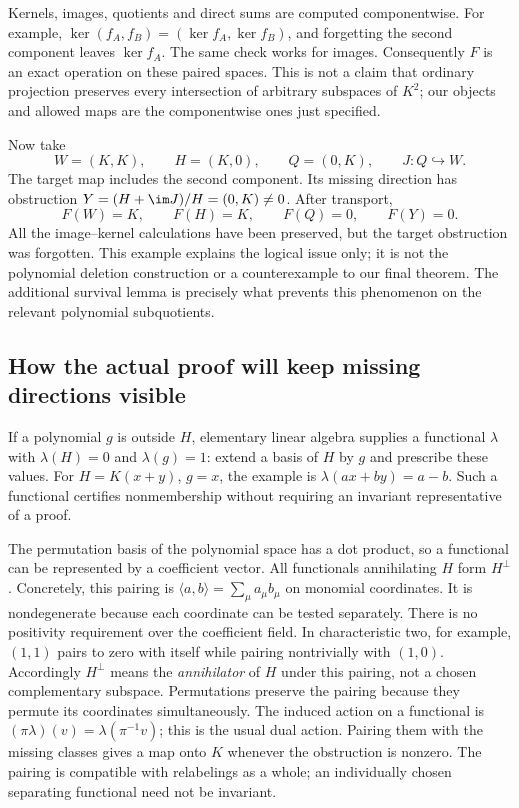 \documentclass[11pt,a4paper,oneside,openany]{book}
\theoremstyle{definition}\newtheorem{definition}[theorem]{Definition}
\theoremstyle{remark}\newtheorem{remark}[theorem]{Remark}
\numberwithin{equation}{chapter}
\begin{document}
Kernels, images, quotients and direct sums are computed componentwise.
For example, $\ker(f_A,f_B)=(\ker f_A,\ker f_B)$, and forgetting the
second component leaves $\ker f_A$. The same check works for images.
Consequently $F$ is an exact operation on these paired spaces.
This is not a claim that ordinary projection preserves every
intersection of arbitrary subspaces of $K^2$; our objects and allowed
maps are the componentwise ones just specified.

Now take
\[
 W=(K,K),\qquad H=(K,0),\qquad Q=(0,K),\qquad
                         J:Q\hookrightarrow W.
\]
The target map includes the second component. Its missing direction
has obstruction
$Y=(H+\im J)/H=(0,K)\ne0$.
After transport,
\[
             F(W)=K,\qquad F(H)=K,\qquad F(Q)=0,\qquad F(Y)=0.
\]
All the image--kernel calculations have been preserved, but the
target obstruction was forgotten.
This example explains the logical issue only; it is not the
polynomial deletion construction or a counterexample to our final
theorem. The additional survival lemma is precisely what prevents
this phenomenon on the relevant polynomial subquotients.

\subsection{How the actual proof will keep missing directions visible}
If a polynomial $g$ is outside $H$, elementary linear algebra supplies
a functional $\lambda$ with $\lambda(H)=0$ and $\lambda(g)=1$:
extend a basis of $H$ by $g$ and prescribe these values.
For $H=K(x+y)$, $g=x$, the example is
$\lambda(ax+by)=a-b$.
Such a functional certifies nonmembership without requiring an
invariant representative of a proof.

The permutation basis of the polynomial space has a dot product,
so a functional can be represented by a coefficient vector.
All functionals annihilating $H$ form $H^\perp$.
Concretely, this pairing is
$\langle a,b\rangle=\sum_\mu a_\mu b_\mu$ on monomial coordinates.
It is nondegenerate because each coordinate can be tested separately.
There is no positivity requirement over the coefficient field.
In characteristic two, for example, $(1,1)$ pairs to zero with itself
while pairing nontrivially with $(1,0)$.
Accordingly $H^\perp$ means the \emph{annihilator} of $H$ under this
pairing, not a chosen complementary subspace.
Permutations preserve the pairing because they permute its coordinates
simultaneously. The induced action on a functional is
$(\pi\lambda)(v)=\lambda(\pi^{-1}v)$; this is the usual dual action.
Pairing them with the missing classes gives a map onto $K$ whenever
the obstruction is nonzero. The pairing is compatible with
relabelings as a whole; an individually chosen separating functional
need not be invariant.
\end{document}
